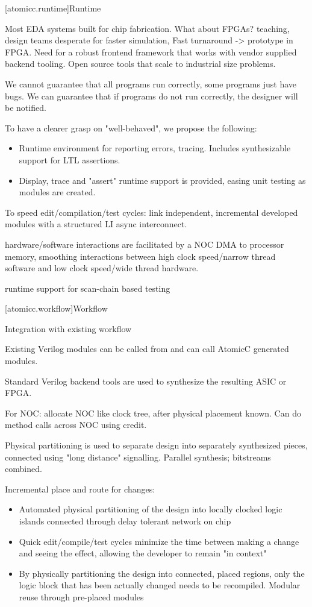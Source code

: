 [atomicc.runtime]{Runtime}

Most EDA systems built for chip fabrication.  What about FPGAs?
{teaching, design teams desperate for faster simulation, Fast turnaround} -> prototype in FPGA.
Need for a robust frontend framework that works with vendor supplied backend tooling.
Open source tools that scale to industrial size problems.

We cannot guarantee that all programs run correctly, some programs just have bugs.
We can guarantee that if programs do not run correctly, the designer will be notified.

To have a clearer grasp on "well-behaved", we propose the following:
\begin{itemize}
\item Runtime environment for reporting errors, tracing.  Includes synthesizable
support for LTL assertions.
\item Display, trace and "assert" runtime support is provided, easing unit testing
as modules are created.
\end{itemize}

To speed edit/compilation/test cycles: link independent, incremental developed modules with a
structured LI async interconnect.


hardware/software interactions are facilitated by a NOC DMA to processor memory,
smoothing interactions between high clock speed/narrow thread software and low clock
speed/wide thread hardware.

runtime support for scan-chain based testing

[atomicc.workflow]{Workflow}

Integration with existing workflow

Existing Verilog modules can be called from and can call AtomicC generated modules.

Standard Verilog backend tools are used to synthesize the resulting ASIC or FPGA.

For NOC: allocate NOC like clock tree, after physical placement known.  Can do 
method calls across NOC using credit.

Physical partitioning is used to separate design into separately synthesized pieces, connected using
"long distance" signalling.  Parallel synthesis; bitstreams combined.

Incremental place and route for changes:
\begin{itemize}
\item Automated physical partitioning of the design into locally clocked logic islands
connected through delay tolerant network on chip
\item Quick edit/compile/test cycles minimize the time between making a change and
seeing the effect, allowing the developer to remain "in context"
\item By physically partitioning the design into connected, placed regions, only the
logic block that has been actually changed needs to be recompiled.  Modular reuse through pre-placed modules
\end{itemize}

